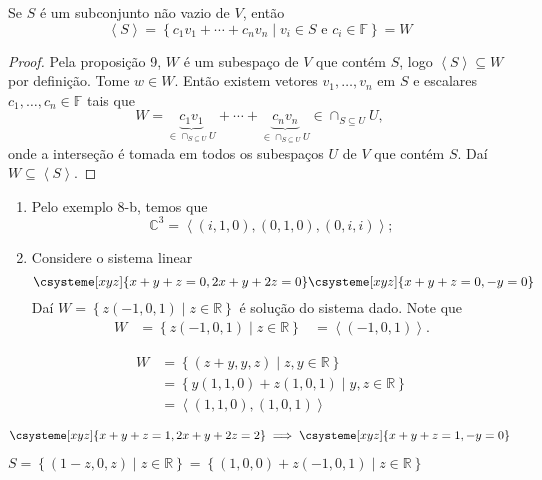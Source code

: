 \begin{proposition}
	Se $S$ é um subconjunto não vazio de $V$, então
	\[
		\left\langle S\right\rangle=
		\left\{
		c_{1}v_{1}+
		\dotsb+
		c_{n}v_{n}
		\mid v_{i}\in S
		\text{ e }
		c_{i}\in
		\mathbb{F}
		\right\}=
		W
	\]
\end{proposition}

\begin{proof}
	Pela proposição 9, $W$ é um subespaço de $V$ que contém $S$, logo $\left\langle S\right\rangle\subseteq W$ por definição.
	Tome $w\in W$. Então existem vetores $v_{1},\dotsc,v_{n}$ em $S$ e escalares $c_{1},\dotsc,c_{n}\in\mathbb{F}$ tais que
	\[
		W=
		\underbrace{c_{1}v_{1}}_{\in\cap_{S\subseteq U} U}+
		\dotsb+
		\underbrace{c_{n}v_{n}}_{\in\cap_{S\subseteq U} U}\in
		\cap_{S\subseteq U}U,
	\]
	onde a interseção é tomada em todos os subespaços $U$ de $V$ que contém $S$.
	Daí $W\subseteq\left\langle S\right\rangle$.
\end{proof}

\begin{example}
	\begin{enumerate}\leavevmode
		\item Pelo exemplo 8-b, temos que
		      \[
			      \mathbb{C}^{3}=
			      \left\langle
			      \left(i,1,0\right),
			      \left(0,1,0\right),
			      \left(0,i,i\right)
			      \right\rangle;
		      \]
		\item Considere o sistema linear
		      \[
			      \csysteme[xyz]{
				      x+y+z=0,
				      2x+y+2z=0
			      }%
			      \csysteme[xyz]{
				      x+y+z=0,
				      -y=0
			      }%
		      \]
		      Daí
		      \begin{math}
			      W=
			      \left\{
			      z\left(-1,0,1\right)\mid
			      z\in\mathbb{R}
			      \right\}
		      \end{math}
		      é solução do sistema dado.
		      Note que
		      \begin{align*}
			      W
			       & =\left\{z\left(-1,0,1\right)\mid z\in\mathbb{R}\right\}
			       & =\left\langle\left(-1,0,1\right)\right\rangle.
		      \end{align*}


		      \begin{align*}
			      W
			       & =
			      \left\{
			      \left(z+y,y,z\right)\mid
			      z,y\in\mathbb{R}
			      \right\}                 \\
			       & =
			      \left\{
			      y\left(1,1,0\right)+
			      z\left(1,0,1\right)\mid
			      y,z\in\mathbb{R}\right\} \\
			       & =
			      \left\langle
			      \left(1,1,0\right),
			      \left(1,0,1\right)
			      \right\rangle
		      \end{align*}
	\end{enumerate}
\end{example}

\[
	\csysteme[xyz]{
		x+y+z=1,
		2x+y+2z=2
	}
	\implies
	\csysteme[xyz]{
		x+y+z=1,
		-y=0
	}%
\]

$S=
	\left\{
	\left(1-z,0,z\right)\mid
	z\in\mathbb{R}
	\right\}=
	\left\{
	\left(1,0,0\right)+
	z\left(-1,0,1\right)\mid
	z\in\mathbb{R}
	\right\}
$
